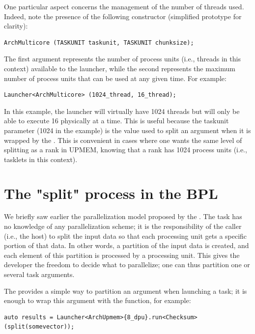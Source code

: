 One particular aspect concerns the management of the number of threads used. Indeed, 
note the presence of the following constructor (simplified prototype for clarity):
\begin{verbatim}
ArchMulticore (TASKUNIT taskunit, TASKUNIT chunksize);
\end{verbatim}
The first argument represents the number of process units (i.e., threads in this context) available to the launcher, 
while the second represents the maximum number of process units that can be used at any given time. For example:
\begin{verbatim}
Launcher<ArchMulticore> (1024_thread, 16_thread);
\end{verbatim}
In this example, the launcher will virtually have 1024 threads but will only be able to execute 16 physically at a time. 
This is useful because the taskunit parameter (1024 in the example) is the value used to split an argument when it is wrapped 
by the . This is convenient in cases where one wants the same level of splitting as a rank in UPMEM,
 knowing that a rank has 1024 process units (i.e., tasklets in this context).

\section{The "split" process in the BPL}

We briefly saw earlier the parallelization model proposed by the \BPL. 
The task has no knowledge of any parallelization scheme; it is the responsibility of the caller (i.e., the host) 
to split the input data so that each processing unit gets a specific portion of that data. 
In other words, a partition of the input data is created, and each element of this partition is processed by a processing unit. 
This gives the developer the freedom to decide what to parallelize; one can thus partition one or several task arguments.

The \BPL provides a simple way to partition an argument when launching a task; it is enough to wrap this argument with the
 function, for example:
\begin{verbatim}
auto results = Launcher<ArchUpmem>{8_dpu}.run<Checksum>(split(somevector));
\end{verbatim}

